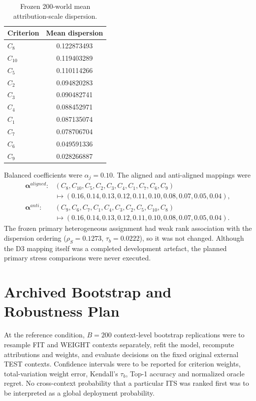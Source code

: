 \documentclass[runningheads,orivec]{llncs}
\begin{document}
\begin{table}[t]
\centering
\caption{Frozen 200-world mean attribution-scale dispersion.}
\label{supp:tab:d3dispersion}
\small
\begin{tabular}{@{}lc@{}}
\toprule
Criterion & Mean dispersion\\
\midrule
$C_8$ & 0.122873493\\
$C_{10}$ & 0.119403289\\
$C_5$ & 0.110114266\\
$C_2$ & 0.094820283\\
$C_3$ & 0.090482741\\
$C_4$ & 0.088452971\\
$C_1$ & 0.087135074\\
$C_7$ & 0.078706704\\
$C_6$ & 0.049591336\\
$C_9$ & 0.028266887\\
\bottomrule
\end{tabular}
\end{table}

Balanced coefficients were $\alpha_j=0.10$. The aligned and anti-aligned mappings were
\begin{align}
\boldsymbol\alpha^{aligned}:
&(C_8,C_{10},C_5,C_2,C_3,C_4,C_1,C_7,C_6,C_9)
\nonumber\\
&\mapsto(0.16,0.14,0.13,0.12,0.11,0.10,0.08,0.07,0.05,0.04),
\label{supp:eq:alphaaligned}\\
\boldsymbol\alpha^{anti}:
&(C_9,C_6,C_7,C_1,C_4,C_3,C_2,C_5,C_{10},C_8)
\nonumber\\
&\mapsto(0.16,0.14,0.13,0.12,0.11,0.10,0.08,0.07,0.05,0.04).
\label{supp:eq:alphaanti}
\end{align}
The frozen primary heterogeneous assignment had weak rank association with the dispersion
ordering ($\rho_S=0.1273$, $\tau_b=0.0222$), so it was not changed. Although the D3 mapping
itself was a completed development artefact, the planned primary stress comparisons were never
executed.

\section{Archived Bootstrap and Robustness Plan}

At the reference condition, $B=200$ context-level bootstrap replications were to resample FIT
and WEIGHT contexts separately, refit the model, recompute attributions and weights, and
evaluate decisions on the fixed original external TEST contexts. Confidence intervals were to
be reported for criterion weights, total-variation weight error, Kendall's $\tau_b$, Top-1
accuracy and normalized oracle regret. No cross-context probability that a particular ITS was
ranked first was to be interpreted as a global deployment probability.
\end{document}
